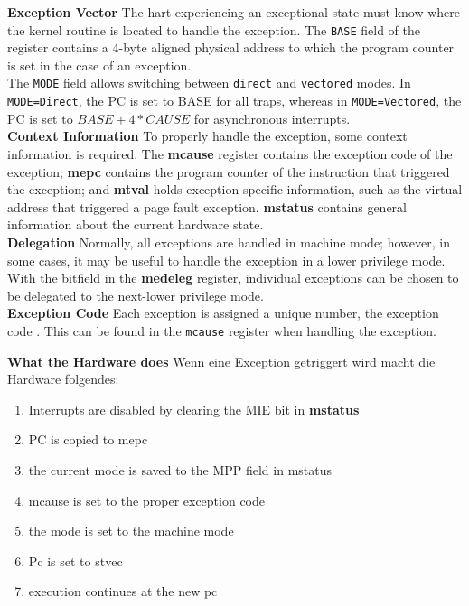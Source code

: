 
\textbf{Exception Vector} The hart  experiencing
an exceptional state must know where the kernel routine is located to handle the exception.
The \texttt{BASE} field of the register contains a 4-byte aligned physical address to which
the program counter is set in the case of an exception.\\
The \texttt{MODE} field allows switching between \texttt{direct} and \texttt{vectored} modes.
In \texttt{MODE=Direct}, the PC is set to BASE for all traps, whereas in \texttt{MODE=Vectored},
the PC is set to $BASE+4*CAUSE$ for asynchronous interrupts.\\


\textbf{Context Information} To properly handle the exception, some context information is required.
The \textbf{mcause} register contains the exception code of the exception; \textbf{mepc} contains
the program counter of the instruction that triggered the exception; and \textbf{mtval} holds
exception-specific information, such as the virtual address that triggered a page fault exception.
\textbf{mstatus} contains general information about the current hardware state.\\

\textbf{Delegation} Normally, all exceptions are handled in machine mode; however, in some cases,
it may be useful to handle the exception in a lower privilege mode. With the bitfield in the
\textbf{medeleg} register, individual exceptions can be chosen to be delegated to the next-lower
privilege mode.\\

\textbf{Exception Code} Each exception is assigned a unique number, the exception code \cite{riscvreader}.
This can be found in the \texttt{mcause} register when handling the exception.



\textbf{What the Hardware does} Wenn eine Exception getriggert wird macht die Hardware folgendes:
\begin{enumerate}
    \item Interrupts are disabled by clearing the MIE bit in \textbf{mstatus}
    \item PC is copied to mepc
    \item the current mode is saved to the MPP field in mstatus
    \item mcause is set to the proper exception code
    \item the mode is set to the machine mode
    \item Pc is set to stvec
    \item execution continues at the new pc
\end{enumerate}

